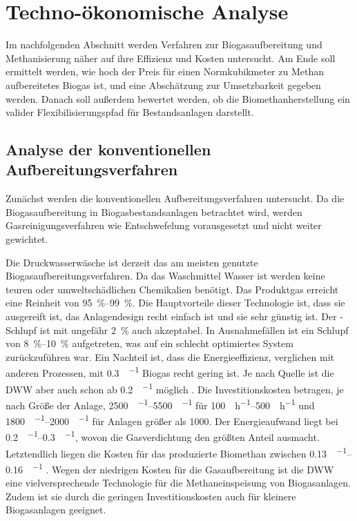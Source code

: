 
\section{Techno-ökonomische Analyse}

Im nachfolgenden Abschnitt werden Verfahren zur Biogasaufbereitung und Methanisierung näher auf ihre Effizienz und Kosten untersucht. Am Ende soll ermittelt werden, wie hoch der Preis für einen Normkubikmeter zu Methan aufbereitetes Biogas ist, und eine Abschätzung zur Umsetzbarkeit gegeben werden. Danach soll außerdem bewertet werden, ob die Biomethanherstellung ein valider Flexibilisierungspfad für Bestandsanlagen darstellt. 

\subsection{Analyse der konventionellen Aufbereitungsverfahren}
Zunächst werden die konventionellen Aufbereitungsverfahren untersucht. Da die Biogasaufbereitung in Biogasbestandsanlagen betrachtet wird, werden Gasreinigungsverfahren wie Entschwefelung vorausgesetzt und nicht weiter gewichtet.  \smallskip

Die Druckwasserwäsche ist derzeit das am meisten genutzte Biogasaufbereitungsverfahren. Da das Waschmittel Wasser ist werden keine teuren oder umweltschädlichen Chemikalien benötigt. Das Produktgas erreicht eine  Reinheit von \SIrange{95}{99}{\percent}. Die Hauptvorteile dieser Technologie ist, dass sie ausgereift ist, das Anlagendesign recht einfach ist und sie sehr günstig ist. Der -Schlupf ist mit ungefähr \SI{2}{\percent} auch akzeptabel. In Ausnahmefällen ist ein Schlupf von \SIrange{8}{10}{\percent} aufgetreten, was auf ein schlecht optimiertes System zurückzuführen war. Ein Nachteil ist, dass die Energieeffizienz, verglichen mit anderen Prozessen, mit \SI{0,3}{\kwh\per\normvol} Biogas recht gering ist. Je nach Quelle ist die \gls{DWW} aber auch schon ab \SI{0,2}{\kwh\per\normvol} möglich \parencite{Coll17} \parencite{Emp18}. Die Investitionskosten betragen, je nach Größe der Anlage, \SIrange{2500}{5500}{\sieuro\per\normvolh} für \SIrange{100}{500}{\normvol\per\hour} und \SIrange{1800}{2000}{\sieuro\per\normvolh} für Anlagen größer als \SI{1000}{\normvolh}. Der Energieaufwand liegt bei \SIrange{0,2}{0,3}{\kwh\per\normvol}, wovon die Gasverdichtung den größten Anteil ausmacht. Letztendlich liegen die Kosten für das produzierte Biomethan zwischen \SIrange{0,13}{0,16}{\sieuro\per\normvol} \parencite{Emp18}. Wegen der niedrigen Kosten für die Gasaufbereitung ist die \gls{DWW} eine vielversprechende Technologie für die Methaneinspeisung von Biogasanlagen. Zudem ist sie durch die geringen Investitionskosten auch für kleinere Biogasanlagen geeignet. \parencite{KGKK2019} \parencite{Struk20}\\

